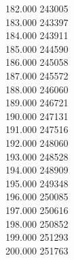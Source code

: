 { 182.000	243005 \\
 183.000	243397 \\
 184.000	243911 \\
 185.000	244590 \\
 186.000	245058 \\
 187.000	245572 \\
 188.000	246060 \\
 189.000	246721 \\
 190.000	247131 \\
 191.000	247516 \\
 192.000	248060 \\
 193.000	248528 \\
 194.000	248909 \\
 195.000	249348 \\
 196.000	250085 \\
 197.000	250616 \\
 198.000	250852 \\
 199.000	251293 \\
 200.000	251763 \\
}
